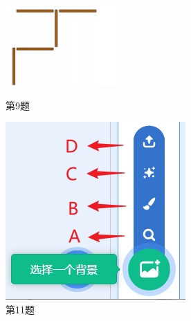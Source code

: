 \documentclass[10pt, a4paper]{article}
\begin{document}
\begin{enumerate}
\begin{figure}[htbp]
\begin{minipage}[t]{.2\textwidth}
                \includegraphics[width=\textwidth]{9.png}
                \caption*{第9题}
            \end{minipage}
            \begin{minipage}[t]{.14\textwidth}
                \centering
                \includegraphics[width=\textwidth]{11.png}
                \caption*{第11题}
            \end{minipage}
            \begin{minipage}[t]{.21\textwidth}

\end{minipage}
\end{figure}
\end{enumerate}
\end{document}
